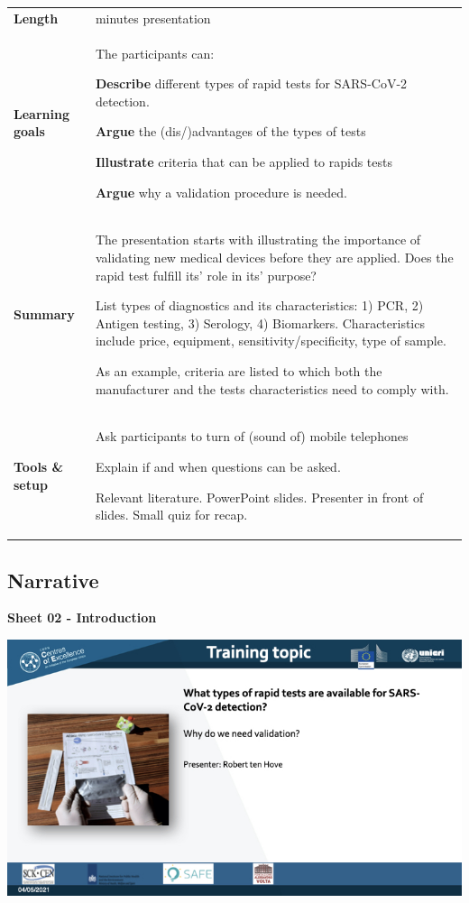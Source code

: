 \documentclass[
]{book}
\begin{document}
\begin{longtable}[]{@{}
  >{\raggedright\arraybackslash}p{}
  >{\raggedright\arraybackslash}p{}@{}}
\toprule
\endhead
\textbf{Length} & 13 minutes presentation \\
\textbf{Learning
goals} & The participants can:

\textbf{Describe} different types of rapid tests for
SARS-CoV-2 detection.

\textbf{Argue} the (dis/)advantages of the types of
tests

\textbf{Illustrate} criteria that can be applied to
rapids tests

\textbf{Argue} why a validation procedure is needed. \\
\textbf{Summary} & The presentation starts with illustrating the
importance of validating new medical devices
before they are applied. Does the rapid test
fulfill its' role in
its' purpose?

List types of diagnostics and its characteristics:
1) PCR, 2) Antigen testing, 3) Serology, 4)
Biomarkers. Characteristics include price,
equipment, sensitivity/specificity, type of
sample.

As an example, criteria are listed to which both
the manufacturer and the tests characteristics
need to comply with. \\
\textbf{Tools \&
setup} & Ask participants to turn of (sound of) mobile
telephones

Explain if and when questions can be asked.

Relevant literature. PowerPoint slides. Presenter
in front of slides. Small quiz for recap. \\
\bottomrule
\end{longtable}

\hypertarget{narrative}{%
\subsection{Narrative}\label{narrative}}

\textbf{Sheet 02 - Introduction}

\includegraphics{images/m02/m02_types_of_rapid_tests_final.002.jpeg}
\end{document}
